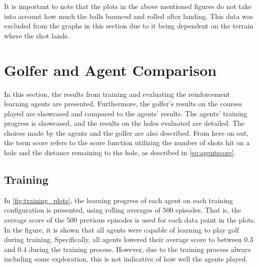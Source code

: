 \documentclass{kththesis}
\begin{document}
It is important to note that the plots in the above mentioned figures do not take into account how much the balls bounced and rolled after landing. This data was excluded from the graphs in this section due to it being dependent on the terrain where the shot lands.

\section{Golfer and Agent Comparison}
In this section, the results from training and evaluating the reinforcement learning agents are presented. Furthermore, the golfer's results on the courses played are showcased and compared to the agents' results. The agents' training progress is showcased, and the results on the holes evaluated are detailed. The choices made by the agents and the golfer are also described. From here on out, the term score refers to the score function utilizing the number of shots hit on a hole and the distance remaining to the hole, as described in \autoref{eq:agentscore}.

\subsection{Training}
In \autoref{fig:training_plots}, the learning progress of each agent on each training configuration is presented, using rolling averages of $500$ episodes. That is, the average score of the $500$ previous episodes is used for each data point in the plots. In the figure, it is shown that all agents were capable of learning to play golf during training. Specifically, all agents lowered their average score to between $0.3$ and $0.4$ during the training process. However, due to the training process always including some exploration, this is not indicative of how well the agents played.
\end{document}
